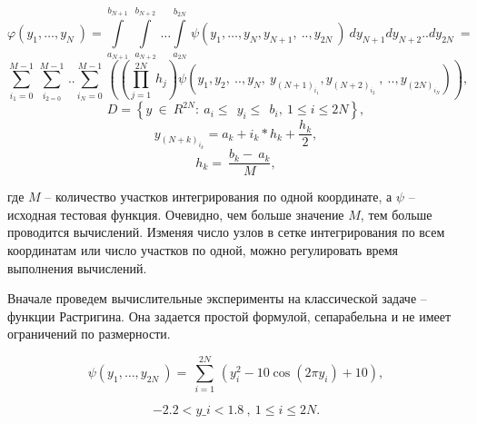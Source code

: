 \documentclass[10pt,a4paper]{book}
\begin{document}
\begin{equation}
\varphi \left( {{y}_{1}},\ldots ,{{y}_{N}}~ \right)=\underset{{{a}_{N+1}}}{\overset{{{b}_{N+1}}}{\mathop \int }}\,\underset{{{a}_{N+2}}}{\overset{{{b}_{N+2}}}{\mathop \int }}\,\ldots \underset{{{a}_{2N}}}{\overset{{{b}_{2N}}}{\mathop \int }}\,\psi \left( {{y}_{1}},\ldots ,{{y}_{N}},{{y}_{N+1}},~..,{{y}_{2N}}~ \right)~d{{y}_{N+1}}d{{y}_{N+2}}..d{{y}_{2N}}~= 
\end{equation}
\begin{displaymath}
\underset{{{i}_{1}}=0}{\overset{M-1}{\mathop \sum }}\,\underset{{{i}_{2=0}}}{\overset{M-1}{\mathop \sum }}\,..\underset{{{i}_{N}}=0}{\overset{M-1}{\mathop \sum }}\,\left( \left( \underset{j=1}{\overset{2N}{\mathop \prod }}\,{{h}_{j}} \right)\psi \left( {{y}_{1}},{{y}_{2}},~..,{{y}_{N}},~{{y}_{{{\left( N+1 \right)}_{{{i}_{1}}}}}},{{y}_{{{\left( N+2 \right)}_{{{i}_{2}}}}}}~,~..,{{y}_{{{\left( 2N \right)}_{{{i}_{N}}}}}} \right) \right),
\end{displaymath}
\begin{displaymath}
D=\left\{ y~\in ~{{R}^{2N}}:~{{a}_{i}}\le ~~{{y}_{i}}\le ~~{{b}_{i}},~1\le i\le 2N \right\},
\end{displaymath}
\begin{equation}
{{y}_{{{\left( N+k \right)}_{{{i}_{k}}}}}}={{a}_{k}}+{{i}_{k}}*{{h}_{k}}+\frac{{{h}_{k}}}{2},
\end{equation}
\begin{equation}
{{h}_{k}}=~\frac{{{b}_{k}}-~{{a}_{k}}}{M},
\end{equation}


	
где $M$ -- количество участков интегрирования по одной координате, а $\psi$ – исходная тестовая функция. Очевидно, чем больше значение $M$, тем больше проводится вычислений. Изменяя число узлов в сетке интегрирования по всем координатам или число участков по одной, можно регулировать время выполнения вычислений.


Вначале проведем вычислительные эксперименты на классической задаче – функции Растригина. Она задается простой формулой, сепарабельна и не имеет ограничений по размерности. 


\begin{equation}
\label{Rastrigin}
\psi \left( {{y}_{1}},\ldots ,{{y}_{2N}}~ \right)=~\underset{i=1}{\overset{2N}{\mathop \sum }}\,(y_{i}^{2}-10\cos \left( 2\pi {{y}_{i}} \right)+10),
\end{equation}

\begin{displaymath}
-2.2<y\_i<1.8~,~1\le i\le 2N.
\end{displaymath}
\end{document}
